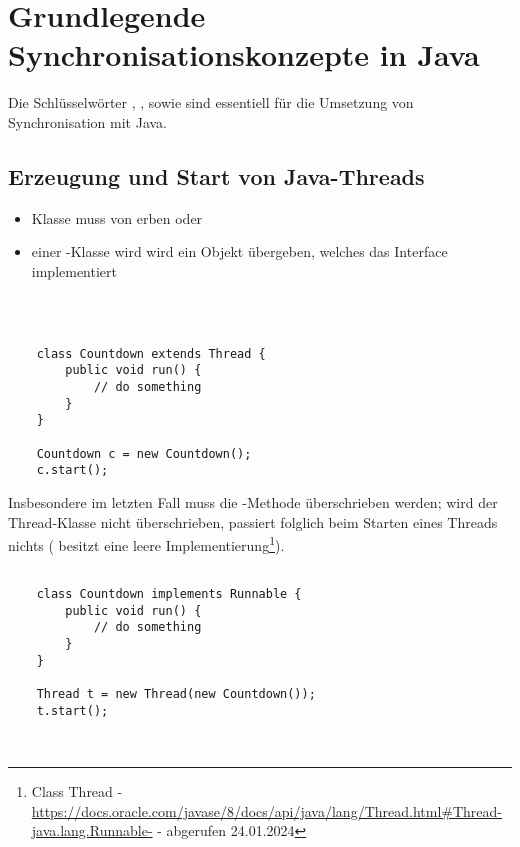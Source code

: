 \chapter{Grundlegende Synchronisationskonzepte in Java}

Die Schlüsselwörter , ,  sowie  sind essentiell für die Umsetzung von Synchronisation mit Java.

\section{Erzeugung und Start von Java-Threads}

\begin{itemize}
    \item Klasse muss von  erben oder
    \item einer -Klasse wird wird ein Objekt übergeben, welches das Interface  implementiert
\end{itemize}\\

\begin{verbatim}

    class Countdown extends Thread {
        public void run() {
            // do something
        }
    }

    Countdown c = new Countdown();
    c.start();
\end{verbatim}


Insbesondere im letzten Fall muss die -Methode überschrieben werden; wird  der Thread-Klasse nicht überschrieben, passiert folglich beim Starten eines Threads nichts ( besitzt eine leere Implementierung\footnote{
    Class Thread - \url{https://docs.oracle.com/javase/8/docs/api/java/lang/Thread.html#Thread-java.lang.Runnable-} - abgerufen 24.01.2024
}).

\begin{verbatim}

    class Countdown implements Runnable {
        public void run() {
            // do something
        }
    }

    Thread t = new Thread(new Countdown());
    t.start();

\end{verbatim}\\

